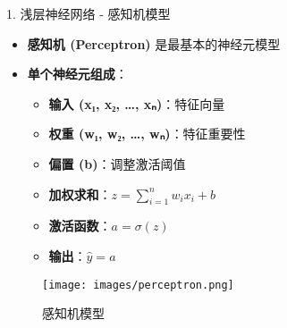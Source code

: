 \documentclass[
  ignorenonframetext,
  aspectratio=169,
  chinese-hans,
]{beamer}
\providecommand{\tightlist}{%
  \setlength{\itemsep}{0pt}\setlength{\parskip}{0pt}}\usepackage{longtable,booktabs,array}
\begin{document}
\begin{frame}{1. 浅层神经网络 - 感知机模型}
\label{ux6d45ux5c42ux795eux7ecfux7f51ux7edc---ux611fux77e5ux673aux6a21ux578b}
\begin{itemize}
\item
  \textbf{感知机 (Perceptron)} 是最基本的神经元模型
\item
  \textbf{单个神经元组成}：

  \begin{itemize}
  \tightlist
  \item
    \textbf{输入 (x₁, x₂, \ldots, xₙ)}：特征向量
  \item
    \textbf{权重 (w₁, w₂, \ldots, wₙ)}：特征重要性
  \item
    \textbf{偏置 (b)}：调整激活阈值
  \item
    \textbf{加权求和}：\(z = \sum_{i=1}^{n} w_i x_i + b\)
  \item
    \textbf{激活函数}：\(a = \sigma(z)\)
  \item
    \textbf{输出}：\(\hat{y} = a\)
  \end{itemize}
\end{itemize}

\begin{figure}[H]

{\centering \texttt{[image: images/perceptron.png]}

}

\caption{感知机模型}

\end{figure}%
\end{frame}
\end{document}
